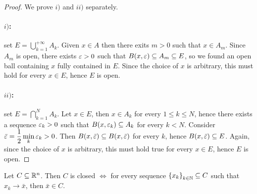 \begin{proof}

    We prove $i)$ and $ii)$ separately.
    
    \paragraph{$i)$:} set $E = \displaystyle\bigcup_{k = 1}^{+\infty} A_k$. Given $x \in A$ then there exits $m > 0$ such that $x \in A_m$. Since $A_m$ is open, there exists $\varepsilon > 0$ such that $B(x,\varepsilon) \subseteq A_m \subseteq E$, so we found an open ball containing $x$ fully contained in $E$. Since the choice of $x$ is arbitrary, this must hold for every $x \in E$, hence $E$ is open.

    \paragraph{$ii)$:} set $E = \displaystyle\bigcap_{k = 1}^N A_k$. Let $x \in E$, then $x \in A_k$ for every $1 \le k \le N$, hence there exists a sequence $\varepsilon_k > 0$ such that $B(x,\varepsilon_k) \subseteq A_k$ for every $k < N$. Consider $\bar{\varepsilon} = \displaystyle\frac12\min_k \varepsilon_k > 0$. Then $B(x,\bar{\varepsilon}) \subseteq B(x,\bar{\varepsilon})$ for every $k$, hence $B(x,\bar{\varepsilon}) \subseteq E$. Again, since the choice of $x$ is arbitrary, this must hold true for every $x \in E$, hence $E$ is open.

\end{proof}

\begin{proposition}

    Let $C \subseteq {\mathbb{R}^n}$. Then $C$ is closed $\iff$ for every sequence $\left\{ x_k \right\}_{k \in \mathbb{N}} \subseteq C$ such that $x_k \to \bar{x}$, then $\bar{x} \in C$. 
    
\end{proposition}

